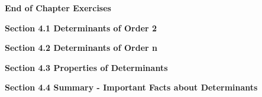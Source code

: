 \documentclass[11pt,largemargins]{homework}
\begin{document}
\maketitle

\textbf{\large{End of Chapter Exercises}}

\textbf{\large{Section 4.1} Determinants of Order 2}

\question

\question

\question

\question

\question

\question

\question

\question

\question

\question

\textbf{\large{Section 4.2} Determinants of Order n}
\setcounter{questionCounter}{0}
\question

\question

\question

\question

\question

\question

\question

\question

\question

\question

\textbf{\large{Section 4.3} Properties of Determinants}
\setcounter{questionCounter}{0}
\question

\question

\question

\question

\question

\question

\question

\question

\question

\question

\textbf{\large{Section 4.4} Summary - Important Facts about Determinants}
\setcounter{questionCounter}{0}
\question
\end{document}
